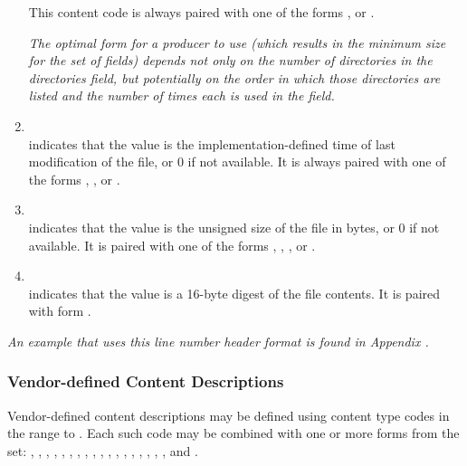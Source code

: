 \begin{enumerate}[1. ]
This content code is always paired with one of 
\bb
the forms
\eb
\DWFORMdataone, \DWFORMdatatwo{} or \DWFORMudata.

\textit{The optimal form for a producer to use (which results in the
minimum size for the set of  fields) depends not only
on the number of directories in the directories
field, but potentially on the order in which those directories are
listed and the number of times each is used in the  field.}

\item \DWLNCTtimestampTARG \\
\DWLNCTtimestampNAME{} indicates that the value is the implementation-defined 
time of last modification of the file, or 0 if not available. 
It is always paired with one of the forms
\DWFORMudata, \DWFORMdatafour, \DWFORMdataeight{} or \DWFORMblock.
   
\item  \DWLNCTsizeTARG \\
\DWLNCTsizeNAME{} indicates that the value is the unsigned size of the
file in bytes, or 0 if not available. It is paired with one of the
forms \DWFORMudata, \DWFORMdataone, \DWFORMdatatwo, \DWFORMdatafour{}
or \DWFORMdataeight.

\item \DWLNCTMDfiveTARG \\
\DWLNCTMDfiveNAME{} indicates that the value is a 16-byte \MDfive{} digest
of the file contents. It is paired with form \DWFORMdatasixteen.
\end{enumerate}

\textit{An example that uses this line number header format
is found in Appendix .}

\subsubsection{Vendor-defined Content Descriptions}
\label{chap:vendordefinedcontentdescriptions}
Vendor-defined content descriptions may be defined using content
type codes in the range \DWLNCTlouserNAME{} to \DWLNCThiuserNAME{}. Each
such code may be combined with one or more forms from the set:
\DWFORMblock, \DWFORMblockone, \DWFORMblocktwo, \DWFORMblockfour,
\DWFORMdataone, \DWFORMdatatwo, \DWFORMdatafour, \DWFORMdataeight,
\DWFORMdatasixteen,
\DWFORMflag, \DWFORMlinestrp, \DWFORMsdata, \DWFORMsecoffset,
\DWFORMstring, \DWFORMstrp, 
\bb
\DWFORMstrpeight,
\DWFORMstrpsup, 
\DWFORMstrpsupeight,
\eb
\DWFORMstrxXN{} and \DWFORMudata.

